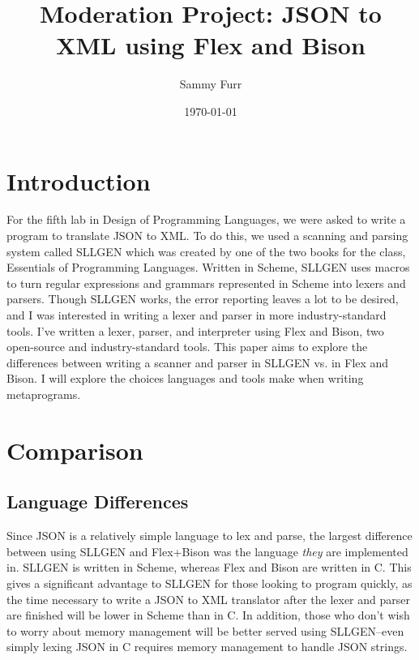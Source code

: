 \documentclass[12pt]{article}
\author{Sammy Furr}
\title{Moderation Project: JSON to XML using Flex and Bison}
\date{\today}
\begin{document}
\begin{titlepage}
\maketitle
\end{titlepage}
\section{Introduction}
For the fifth lab in Design of Programming Languages, we were asked to
write a program to translate JSON to XML.  To do this, we used a
scanning and parsing system called SLLGEN which was created by one of
the two books for the class, Essentials of Programming Languages.\cite[pg.379]{eopl}
Written in Scheme, SLLGEN uses macros to turn regular expressions and
grammars represented in Scheme into lexers and parsers.  Though SLLGEN
works, the error reporting leaves a lot to be desired, and I was
interested in writing a lexer and parser in more industry-standard
tools.  I've written a lexer, parser, and interpreter using Flex and
Bison, two open-source and industry-standard tools.  This paper aims
to explore the differences between writing a scanner and parser in
SLLGEN vs. in Flex and Bison.  I will explore the choices languages
and tools make when writing metaprograms.
\section{Comparison}
\subsection{Language Differences}
Since JSON is a relatively simple language to lex and parse, the
largest difference between using SLLGEN and Flex+Bison was the
language \textit{they} are implemented in.  SLLGEN is written in
Scheme, whereas Flex and Bison are written in C.  This gives a
significant advantage to SLLGEN for those looking to program quickly,
as the time necessary to write a JSON to XML translator after the
lexer and parser are finished will be lower in Scheme than in C.  In
addition, those who don't wish to worry about memory management will
be better served using SLLGEN--even simply lexing JSON in C requires
memory management to handle JSON strings.
\end{document}
